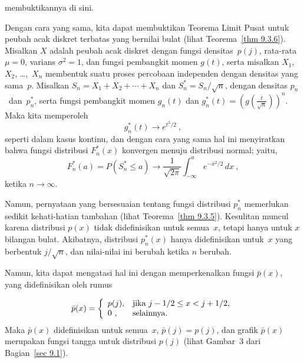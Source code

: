 membuktikannya di sini.
\par
Dengan cara yang sama, kita dapat membuktikan Teorema Limit Pusat untuk peubah acak
diskret terbatas yang bernilai bulat (lihat Teorema~\ref{thm 9.3.6}).  Misalkan $X$ adalah
peubah acak diskret dengan fungsi densitas~$p(j)$, rata-rata $\mu = 0$, varians
$\sigma^2 = 1$, dan fungsi pembangkit momen $g(t)$, serta misalkan $X_1$,~$X_2$,
\ldots,~$X_n$ membentuk suatu proses percobaan independen dengan densitas yang sama~$p$.  Misalkan
$S_n = X_1 + X_2 +\cdots+ X_n$ dan $S_n^* = S_n/\sqrt n$, dengan densitas
$p_n$~dan~$p_n^*$, serta fungsi pembangkit momen $g_n(t)$ dan
$g_n^*(t) = \left(g(\frac t{\sqrt n})\right)^n.$
Maka kita memperoleh
$$
g_n^*(t) \to e^{t^2/2}\ ,
$$
seperti dalam kasus kontinu, dan dengan cara yang sama hal ini menyiratkan bahwa
fungsi distribusi $F_n^*(x)$ konvergen menuju distribusi normal; yaitu,
$$
F_n^*(a) = P(S_n^* \leq a) \to \frac1{\sqrt{2\pi}} \int_{-\infty}^a
e^{-x^2/2}\, dx\ ,
$$ 
ketika $n \rightarrow \infty$.
\par
Namun, pernyataan yang bersesuaian tentang fungsi distribusi $p_n^*$
memerlukan sedikit kehati-hatian tambahan (lihat Teorema~\ref{thm 9.3.5}).  Kesulitan muncul
karena distribusi $p(x)$ tidak didefinisikan untuk semua~$x$, tetapi hanya untuk
$x$ bilangan bulat.  Akibatnya, distribusi $p_n^*(x)$ hanya didefinisikan untuk~$x$ yang
berbentuk $j/\sqrt n$, dan nilai-nilai ini berubah ketika $n$ berubah.

Namun, kita dapat mengatasi hal ini dengan memperkenalkan fungsi $\bar p(x)$, yang didefinisikan
oleh rumus

$$
\bar p(x) =  \left \{ \begin{array}{ll}
                        p(j), & \mbox{jika $j - 1/2 \leq x < j + 1/2$,} \cr
                         0\ , & \mbox{selainnya}.\end{array}\right.
$$
Maka $\bar p(x)$ didefinisikan untuk semua~$x$, $\bar p(j) = p(j)$, dan
grafik $\bar p(x)$ merupakan fungsi tangga untuk distribusi $p(j)$ (lihat Gambar~3
dari Bagian~\ref{sec 9.1}).

